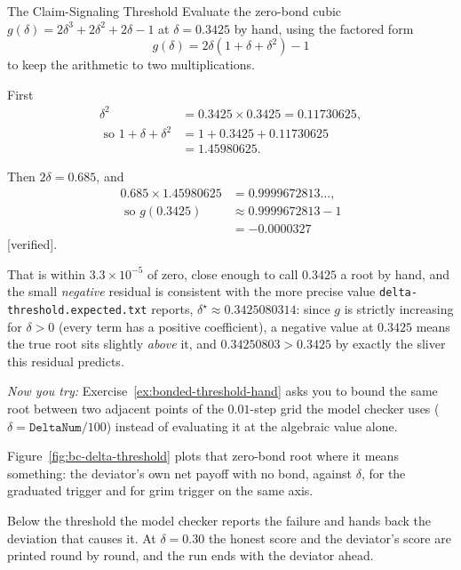 \documentclass[11pt,a4paper]{article}
\theoremstyle{definition}
\theoremstyle{remark}
\begin{document}
\begin{pdexample}{The Claim-Signaling Threshold}
\setlength{\parskip}{4pt plus 1pt}
Evaluate the zero-bond cubic $g(\delta) = 2\delta^3+2\delta^2+2\delta-1$ at $\delta=0.3425$ by hand, using the factored form \[
g(\delta)=2\delta(1+\delta+\delta^2)-1
\] to keep the arithmetic to two multiplications.

First \[
\begin{aligned}
\delta^2 &= 0.3425 \times 0.3425 = 0.11730625,\\
\text{ so }1+\delta+\delta^2 &= 1 + 0.3425 + 0.11730625\\
&= 1.45980625.
\end{aligned}
\]

Then $2\delta = 0.685$, and \[
\begin{aligned}
0.685 \times 1.45980625 &= 0.9999672813\ldots,\\
\text{ so }g(0.3425) &\approx 0.9999672813 - 1\\
&= -0.0000327
\end{aligned}
\] [verified].

That is within $3.3\times10^{-5}$ of zero, close enough to call $0.3425$ a root by hand, and the small \emph{negative} residual is consistent with the more precise value \texttt{delta-threshold.expected.txt} reports, $\delta^\star \approx 0.3425080314$: since $g$ is strictly increasing for $\delta>0$ (every term has a positive coefficient), a negative value at $0.3425$ means the true root sits slightly \emph{above} it, and $0.34250803 > 0.3425$ by exactly the sliver this residual predicts.

\emph{Now you try:} Exercise~\ref{ex:bonded-threshold-hand} asks you to bound the same root between two adjacent points of the $0.01$-step grid the model checker uses ($\delta=\texttt{DeltaNum}/100$) instead of evaluating it at the algebraic value alone.
\end{pdexample}

Figure~\ref{fig:bc-delta-threshold} plots that zero-bond root where it means
something: the deviator's own net payoff with no bond, against $\delta$, for
the graduated trigger and for grim trigger on the same axis.


\FloatBarrier

Below the threshold the model checker reports the failure and hands back the
deviation that causes it. At $\delta=0.30$ the honest score and the deviator's score are printed round by
round, and the run ends with the deviator ahead.
\end{document}

